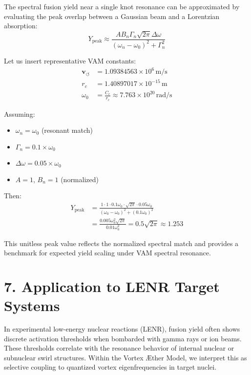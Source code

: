 \documentclass[a4paper, aps,preprint,superscriptaddress, 12pt]{revtex4}
\begin{document}
The spectral fusion yield near a single knot resonance can be approximated by evaluating the peak overlap between a Gaussian beam and a Lorentzian absorption:
\begin{equation}
Y_{\text{peak}} \approx \frac{A B_n \Gamma_n \sqrt{2\pi} \Delta \omega}{(\omega_n - \omega_0)^2 + \Gamma_n^2}
\end{equation}

Let us insert representative VAM constants:
\begin{align*}
\mathbf{v}_{\scriptscriptstyle\boldsymbol{\circlearrowleft}} &= 1.09384563 \times 10^6 \, \text{m/s} \\
r_c &= 1.40897017 \times 10^{-15} \, \text{m} \\
\omega_0 &= \frac{C_e}{r_c} \approx 7.763 \times 10^{20} \, \text{rad/s}
\end{align*}

Assuming:
\begin{itemize}
  \item $\omega_n = \omega_0$ (resonant match)
  \item $\Gamma_n = 0.1 \times \omega_0$
  \item $\Delta \omega = 0.05 \times \omega_0$
  \item $A = 1$, $B_n = 1$ (normalized)
\end{itemize}

Then:
\begin{align*}
Y_{\text{peak}} &= \frac{1 \cdot 1 \cdot 0.1 \omega_0 \cdot \sqrt{2\pi} \cdot 0.05 \omega_0}{(\omega_0 - \omega_0)^2 + (0.1 \omega_0)^2} \\
&= \frac{0.005 \omega_0^2 \sqrt{2\pi}}{0.01 \omega_0^2} = 0.5 \sqrt{2\pi} \approx 1.253
\end{align*}

This unitless peak value reflects the normalized spectral match and provides a benchmark for expected yield scaling under VAM spectral resonance.
\section*{7. Application to LENR Target Systems}

In experimental low-energy nuclear reactions (LENR), fusion yield often shows discrete activation thresholds when bombarded with gamma rays or ion beams. These thresholds correlate with the resonance behavior of internal nuclear or subnuclear swirl structures. Within the Vortex Æther Model, we interpret this as selective coupling to quantized vortex eigenfrequencies in target nuclei.
\end{document}
